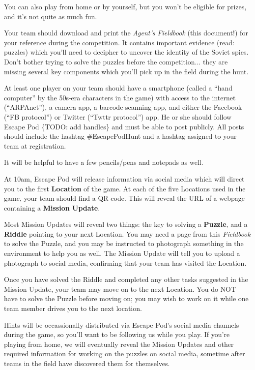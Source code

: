 \documentclass{puzzlehunt}
\begin{document}
You can also play from home or by yourself, but you won't be eligible for prizes, and
it's not quite as much fun.


Your team should download and print the \textit{Agent's Fieldbook} (this document!)
for your reference during the competition. It contains important evidence
(read: puzzles) which you'll need to decipher to uncover the identity of the
Soviet spies. Don't bother trying to solve the puzzles before the competition...
they are missing several key components which you'll pick up in the field during
the hunt.

At least one player on your team should have a smartphone (called a
``hand computer'' by the 50s-era characters in the game) with access to the
internet (``ARPAnet''), a camera app, a barcode scanning app, and either
the Facebook (``FB protocol'') or Twitter (``Twttr protocol'') app.
He or she should follow Escape Pod \{TODO: add handles\} and must be able
to post publicly. All posts should include the hashtag \#EscapePodHunt
and a hashtag assigned to your team at registration.

It will be helpful to have a few pencils/pens and notepads as well.


At 10am, Escape Pod will release information via social media which will direct
you to the first \textbf{Location} of the game. At each of the five Locations used
in the game, your team should find a QR code. This will reveal the URL of a
webpage containing a \textbf{Mission Update}.

Most Mission Updates will reveal two things: the key to solving a \textbf{Puzzle},
and a \textbf{Riddle} pointing to your next Location. You may need a page from
this \textit{Fieldbook} to solve the Puzzle, and you may be instructed
to photograph something in the environment to help you as well. The Mission Update
will tell you to upload a photograph to social media, confirming that your team
has visited the Location.

Once you have solved the Riddle and completed any other tasks suggested in
the Mission Update, your team may move on to the next Location. You do NOT have
to solve the Puzzle before moving on; you may wish to work on it while one team member
drives you to the next location.

Hints will be occassionally distributed via Escape Pod's social media channels
during the game, so you'll want to be following us while you play. If you're playing
from home, we will eventually reveal the Mission Updates and other required information
for working on the puzzles on social media, sometime after teams in the field have
discovered them for themselves.
\end{document}
